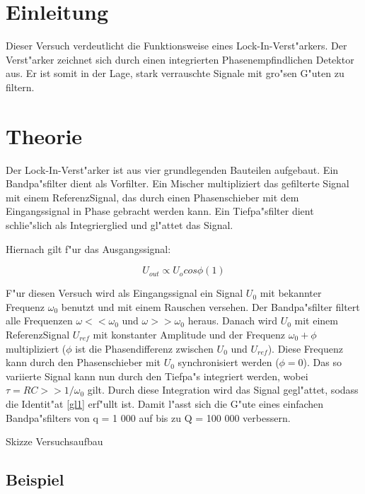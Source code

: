 \documentclass{scrartcl}
\begin{document}
	\section{Einleitung}

		Dieser Versuch verdeutlicht die Funktionsweise eines Lock-In-Verst"arkers.
		Der Verst"arker zeichnet sich durch einen integrierten Phasenempfindlichen Detektor aus.
		Er ist somit in der Lage, stark verrauschte Signale mit gro"sen G"uten zu filtern.


	\section{Theorie}

		Der Lock-In-Verst"arker ist aus vier grundlegenden Bauteilen aufgebaut.
		Ein Bandpa"sfilter dient als Vorfilter. Ein Mischer multipliziert das gefilterte Signal mit einem ReferenzSignal,
		das durch einen Phasenschieber mit dem Eingangssignal in Phase gebracht werden kann.
		Ein Tiefpa"sfilter dient schlie"slich als Integrierglied und gl"attet das Signal.

		Hiernach gilt f"ur das Ausgangssignal:

		\begin{equation}
			\label{gl1}
			U_{out} \propto U_o cos \phi (1)
		\end{equation}

		F"ur diesen Versuch wird als Eingangssignal ein Signal $U_0$ mit bekannter Frequenz $\omega_0$ benutzt und mit einem Rauschen versehen.
		Der Bandpa"sfilter filtert alle Frequenzen $\omega << \omega_0$ und $\omega >> \omega_0$ heraus.
		Danach wird $U_0$ mit einem ReferenzSignal $U_{ref}$ mit konstanter Amplitude und der Frequenz $\omega_0 + \phi$ multipliziert ($\phi$ ist die Phasendifferenz zwischen $U_0$ und $U_{ref}$).
		Diese Frequenz kann durch den Phasenschieber mit $U_0$ synchronisiert werden ($\phi = 0$). Das so variierte Signal kann nun durch den Tiefpa"s integriert werden,
		wobei $\tau = RC >> 1/\omega_0$ gilt.
		Durch diese Integration wird das Signal gegl"attet, sodass die Identit"at \ref{gl1} erf"ullt ist.
		Damit l"asst sich die G"ute eines einfachen Bandpa"sfilters von q = 1 000 auf bis zu Q = 100 000 verbessern.


		Skizze Versuchsaufbau

		\label{beispiel}
		\subsection{Beispiel} 
\end{document}
